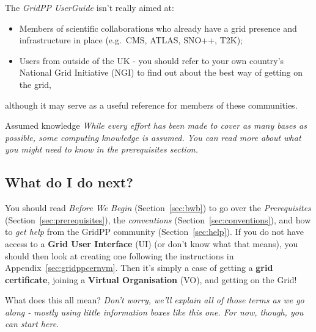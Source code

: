 The \emph{GridPP UserGuide} isn't really aimed at:

\begin{itemize}
\tightlist
\item
  Members of scientific collaborations who already have a grid presence
  and infrastructure in place (e.g.~CMS, ATLAS, SNO++, T2K);
\item
  Users from outside of the UK - you should refer to your own country's
  National Grid Initiative (NGI) to find out about the best way of
  getting on the grid,
\end{itemize}

although it may serve as a useful reference for members of these
communities.

\begin{warningbox}{Assumed knowledge}
\emph{While every effort has been made to cover as many bases as possible,
some computing knowledge is assumed. You can read more about what you
might need to know in the prerequisites section.}
\end{warningbox}


\subsection{What do I do next?}
\label{what-do-i-do-next}
You should read \emph{Before We Begin} (Section~\ref{sec:bwb})
to go over the \emph{Prerequisites} (Section~\ref{sec:prerequisites}),
the \emph{conventions} (Section~\ref{sec:conventions}),
and how to \emph{get help} from the GridPP community (Section~\ref{sec:help}).
If you do not have access to a \textbf{Grid User
Interface} (UI) (or don't know what that means), you should then look at
creating one following the instructions
in Appendix~\ref{sec:gridppcernvm}.
Then it's simply a case
of getting a \textbf{grid certificate}, joining a \textbf{Virtual
Organisation} (VO), and getting on the Grid!

\begin{hintbox}{What does this all mean?}
\emph{Don't worry, we'll explain all of those terms as we go along - mostly
using little information boxes like this one. For now, though, you can
start here.}
\end{hintbox}
